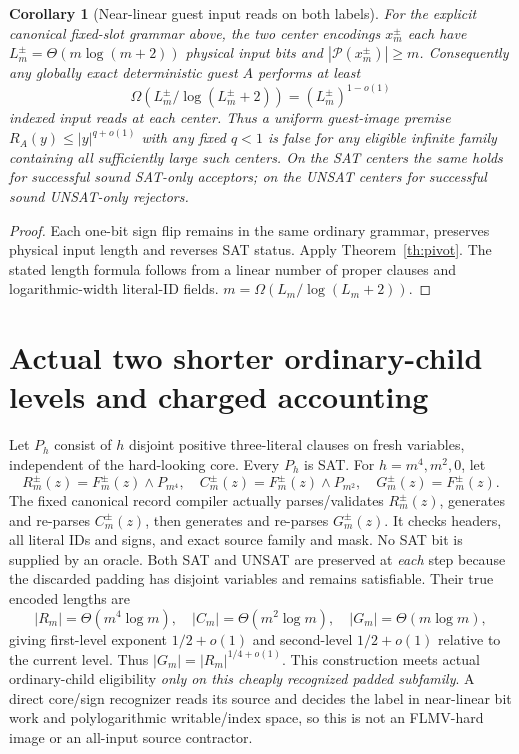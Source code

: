 \documentclass[11pt]{article}
\newtheorem{corollary}[theorem]{Corollary}
\begin{document}
\begin{corollary}[Near-linear guest input reads on both labels]
For the explicit canonical fixed-slot grammar above, the
two center encodings $x_m^\pm$ each have
$L_m^\pm=\Theta(m\log(m+2))$ physical input bits and
$|\mathcal P(x_m^\pm)|\ge m$. Consequently any globally exact
deterministic guest $A$ performs at least
\[
 \Omega(L_m^\pm/\log(L_m^\pm+2))
 = (L_m^\pm)^{1-o(1)}
\]
indexed input reads at \emph{each center}. Thus a uniform
guest-image premise $R_A(y)\le |y|^{q+o(1)}$ with any fixed
$q<1$ is false for any eligible infinite family containing
all sufficiently large such centers. On the SAT centers the
same holds for successful sound SAT-only acceptors; on the
UNSAT centers for successful sound UNSAT-only rejectors.
\end{corollary}
\begin{proof}
Each one-bit sign flip remains in the same ordinary grammar,
preserves physical input length and reverses SAT status.
Apply Theorem~\ref{th:pivot}. The stated length formula follows
from a linear number of proper clauses and logarithmic-width
literal-ID fields. $m=\Omega(L_m/\log(L_m+2))$.
\end{proof}

\section{Actual two shorter ordinary-child levels and charged accounting}
Let $P_h$ consist of $h$ disjoint positive three-literal clauses
on fresh variables, independent of the hard-looking core.
Every $P_h$ is SAT. For $h=m^4,m^2,0$, let
\[
 R_m^\pm(z)=F_m^\pm(z)\wedge P_{m^4},\quad
 C_m^\pm(z)=F_m^\pm(z)\wedge P_{m^2},\quad
 G_m^\pm(z)=F_m^\pm(z).
\]
The fixed canonical record compiler actually parses/validates
$R_m^\pm(z)$, generates and re-parses $C_m^\pm(z)$, then
generates and re-parses $G_m^\pm(z)$. It checks headers,
all literal IDs and signs, and exact source family and mask.
No SAT bit is supplied by an oracle. Both SAT and UNSAT
are preserved at \emph{each} step because the discarded
padding has disjoint variables and remains satisfiable.
Their true encoded lengths are
\[
 |R_m|=\Theta(m^4\log m),\quad
 |C_m|=\Theta(m^2\log m),\quad
 |G_m|=\Theta(m\log m),
\]
giving first-level exponent $1/2+o(1)$ and second-level
$1/2+o(1)$ relative to the current level.
Thus $|G_m|=|R_m|^{1/4+o(1)}$.
This construction meets actual ordinary-child eligibility
\emph{only on this cheaply recognized padded subfamily}.
A direct core/sign recognizer reads its source and decides
the label in near-linear bit work and polylogarithmic
writable/index space, so this is not an FLMV-hard image or
an all-input source contractor.
\end{document}
